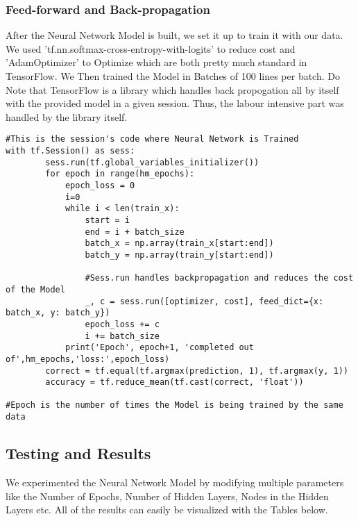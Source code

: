 \subsubsection{Feed-forward and Back-propagation}
After the Neural Network Model is built, we set it up to train it with our data. We used 'tf.nn.softmax-cross-entropy-with-logits' to reduce cost and 'AdamOptimizer' to Optimize  which are both pretty much standard in TensorFlow. We Then trained the Model in Batches of 100 lines per batch. Do Note that TensorFlow is a library which handles back propogation all by itself with the provided model in a given session. Thus, the labour intensive part was handled by the library itself.

\begin{verbatim}
#This is the session's code where Neural Network is Trained
with tf.Session() as sess:
        sess.run(tf.global_variables_initializer())
        for epoch in range(hm_epochs):
            epoch_loss = 0
            i=0
            while i < len(train_x):
                start = i
                end = i + batch_size
                batch_x = np.array(train_x[start:end])
                batch_y = np.array(train_y[start:end])
                
                #Sess.run handles backpropagation and reduces the cost of the Model
                _, c = sess.run([optimizer, cost], feed_dict={x: batch_x, y: batch_y})
                epoch_loss += c
                i += batch_size
            print('Epoch', epoch+1, 'completed out of',hm_epochs,'loss:',epoch_loss)
        correct = tf.equal(tf.argmax(prediction, 1), tf.argmax(y, 1))
        accuracy = tf.reduce_mean(tf.cast(correct, 'float'))

#Epoch is the number of times the Model is being trained by the same data
\end{verbatim}

\subsection{Testing and Results}
We experimented the Neural Network Model by modifying multiple parameters like the Number of Epochs, Number of Hidden Layers, Nodes in the Hidden Layers etc. All of the results can easily be visualized with the Tables below.

